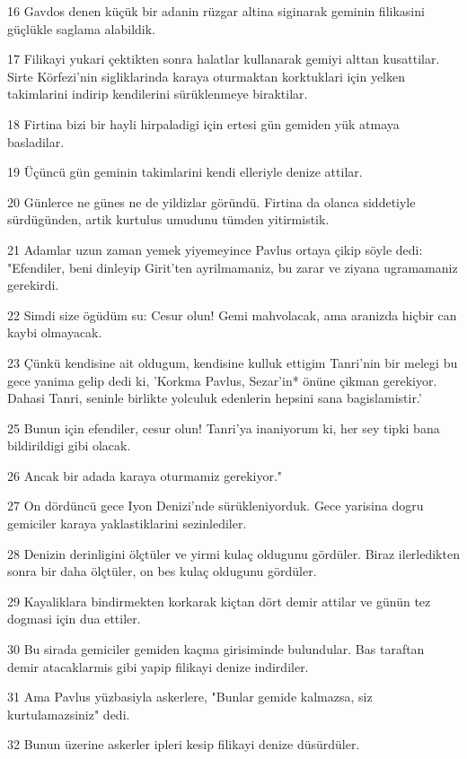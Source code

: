 \par 16 Gavdos denen küçük bir adanin rüzgar altina siginarak geminin filikasini güçlükle saglama alabildik.
\par 17 Filikayi yukari çektikten sonra halatlar kullanarak gemiyi alttan kusattilar. Sirte Körfezi'nin sigliklarinda karaya oturmaktan korktuklari için yelken takimlarini indirip kendilerini sürüklenmeye biraktilar.
\par 18 Firtina bizi bir hayli hirpaladigi için ertesi gün gemiden yük atmaya basladilar.
\par 19 Üçüncü gün geminin takimlarini kendi elleriyle denize attilar.
\par 20 Günlerce ne günes ne de yildizlar göründü. Firtina da olanca siddetiyle sürdügünden, artik kurtulus umudunu tümden yitirmistik.
\par 21 Adamlar uzun zaman yemek yiyemeyince Pavlus ortaya çikip söyle dedi: "Efendiler, beni dinleyip Girit'ten ayrilmamaniz, bu zarar ve ziyana ugramamaniz gerekirdi.
\par 22 Simdi size ögüdüm su: Cesur olun! Gemi mahvolacak, ama aranizda hiçbir can kaybi olmayacak.
\par 23 Çünkü kendisine ait oldugum, kendisine kulluk ettigim Tanri'nin bir melegi bu gece yanima gelip dedi ki, 'Korkma Pavlus, Sezar'in* önüne çikman gerekiyor. Dahasi Tanri, seninle birlikte yolculuk edenlerin hepsini sana bagislamistir.'
\par 25 Bunun için efendiler, cesur olun! Tanri'ya inaniyorum ki, her sey tipki bana bildirildigi gibi olacak.
\par 26 Ancak bir adada karaya oturmamiz gerekiyor."
\par 27 On dördüncü gece Iyon Denizi'nde sürükleniyorduk. Gece yarisina dogru gemiciler karaya yaklastiklarini sezinlediler.
\par 28 Denizin derinligini ölçtüler ve yirmi kulaç oldugunu gördüler. Biraz ilerledikten sonra bir daha ölçtüler, on bes kulaç oldugunu gördüler.
\par 29 Kayaliklara bindirmekten korkarak kiçtan dört demir attilar ve günün tez dogmasi için dua ettiler.
\par 30 Bu sirada gemiciler gemiden kaçma girisiminde bulundular. Bas taraftan demir atacaklarmis gibi yapip filikayi denize indirdiler.
\par 31 Ama Pavlus yüzbasiyla askerlere, "Bunlar gemide kalmazsa, siz kurtulamazsiniz" dedi.
\par 32 Bunun üzerine askerler ipleri kesip filikayi denize düsürdüler.
